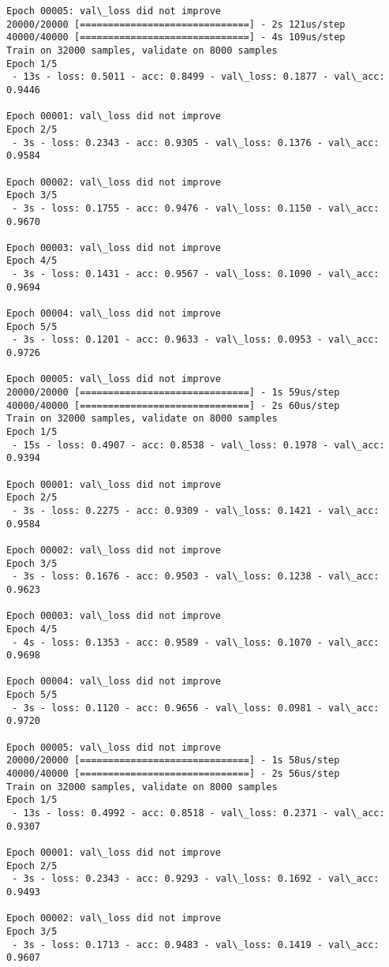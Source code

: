 \documentclass[11pt]{article}
\begin{document}
\begin{Verbatim}[commandchars=\\\{\}]
Epoch 00005: val\_loss did not improve
20000/20000 [==============================] - 2s 121us/step
40000/40000 [==============================] - 4s 109us/step
Train on 32000 samples, validate on 8000 samples
Epoch 1/5
 - 13s - loss: 0.5011 - acc: 0.8499 - val\_loss: 0.1877 - val\_acc: 0.9446

Epoch 00001: val\_loss did not improve
Epoch 2/5
 - 3s - loss: 0.2343 - acc: 0.9305 - val\_loss: 0.1376 - val\_acc: 0.9584

Epoch 00002: val\_loss did not improve
Epoch 3/5
 - 3s - loss: 0.1755 - acc: 0.9476 - val\_loss: 0.1150 - val\_acc: 0.9670

Epoch 00003: val\_loss did not improve
Epoch 4/5
 - 3s - loss: 0.1431 - acc: 0.9567 - val\_loss: 0.1090 - val\_acc: 0.9694

Epoch 00004: val\_loss did not improve
Epoch 5/5
 - 3s - loss: 0.1201 - acc: 0.9633 - val\_loss: 0.0953 - val\_acc: 0.9726

Epoch 00005: val\_loss did not improve
20000/20000 [==============================] - 1s 59us/step
40000/40000 [==============================] - 2s 60us/step
Train on 32000 samples, validate on 8000 samples
Epoch 1/5
 - 15s - loss: 0.4907 - acc: 0.8538 - val\_loss: 0.1978 - val\_acc: 0.9394

Epoch 00001: val\_loss did not improve
Epoch 2/5
 - 3s - loss: 0.2275 - acc: 0.9309 - val\_loss: 0.1421 - val\_acc: 0.9584

Epoch 00002: val\_loss did not improve
Epoch 3/5
 - 3s - loss: 0.1676 - acc: 0.9503 - val\_loss: 0.1238 - val\_acc: 0.9623

Epoch 00003: val\_loss did not improve
Epoch 4/5
 - 4s - loss: 0.1353 - acc: 0.9589 - val\_loss: 0.1070 - val\_acc: 0.9698

Epoch 00004: val\_loss did not improve
Epoch 5/5
 - 3s - loss: 0.1120 - acc: 0.9656 - val\_loss: 0.0981 - val\_acc: 0.9720

Epoch 00005: val\_loss did not improve
20000/20000 [==============================] - 1s 58us/step
40000/40000 [==============================] - 2s 56us/step
Train on 32000 samples, validate on 8000 samples
Epoch 1/5
 - 13s - loss: 0.4992 - acc: 0.8518 - val\_loss: 0.2371 - val\_acc: 0.9307

Epoch 00001: val\_loss did not improve
Epoch 2/5
 - 3s - loss: 0.2343 - acc: 0.9293 - val\_loss: 0.1692 - val\_acc: 0.9493

Epoch 00002: val\_loss did not improve
Epoch 3/5
 - 3s - loss: 0.1713 - acc: 0.9483 - val\_loss: 0.1419 - val\_acc: 0.9607


\end{Verbatim}
\end{document}
